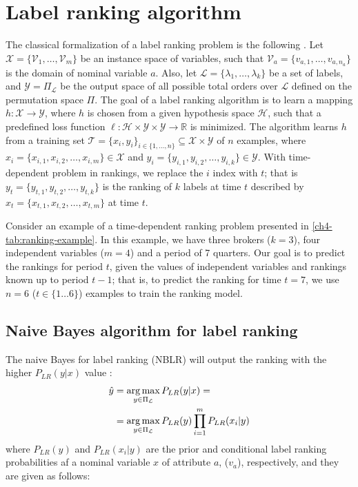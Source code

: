 \section{Label ranking algorithm}
\label{ch4-sec:lr}

The classical formalization of a label ranking problem is the following \citep{vembu2009}. Let $\mathcal{X} = \{\mathcal{V}_1,\ldots,\mathcal{V}_m\}$ be an instance space of  variables, such that $\mathcal{V}_a=\{v_{a,1}, \ldots, v_{a,n_a}\}$ is the domain of nominal variable $a$.  Also, let $\mathcal{L} = \{\lambda_1,\ldots,\lambda_k\}$ be a set of labels, and $\mathcal{Y} = \Pi_{\mathcal{L}}$ be the output space of all possible total orders over $\mathcal{L}$ defined on the permutation space $\Pi$. The goal of a label ranking algorithm is to learn a mapping $h: \mathcal{X} \rightarrow \mathcal{Y}$, where $h$ is chosen from a given hypothesis space $\mathcal{H}$, such that a predefined loss function $\ell: \mathcal{H} \times \mathcal{Y} \times \mathcal{Y} \rightarrow \mathbb{R}$ is minimized. The algorithm learns $h$ from a training set $\mathcal{T}=\{x_i,y_i\}_{i \in \{1, \ldots, n\}} \subseteq \mathcal{X} \times \mathcal{Y}$ of $n$ examples, where $x_i = \{x_{i,1}, x_{i,2}, \ldots, x_{i,m} \} \in \mathcal{X}$ and $ y_i = \{y_{i,1}, y_{i,2}, \dots, y_{i,k}\} \in \mathcal{Y} $. With time-dependent problem in rankings, we replace the $i$ index with $t$; that is $y_t=\{ y_{t,1}, y_{t,2}, \ldots, y_{t,k} \}$ is the ranking of $k$ labels at time $t$ described by $x_t = \{x_{t,1}, x_{t,2}, \ldots, x_{t,m} \} $ at time $t$.


Consider an example of a time-dependent ranking problem presented in \ref{ch4-tab:ranking-example}. In this example, we have three brokers ($k=3$), four independent variables ($m=4$) and a period of 7 quarters. Our goal is to predict the rankings for period $t$, given the values of independent variables and rankings known up to period $t-1$; that is, to predict the ranking for time $t=7$, we use $n=6$ ($t \in \{1 \ldots 6\}$) examples to train the ranking model.




\subsection{Naive Bayes algorithm for label ranking}
\label{ch4-nbr}
The naive Bayes for label ranking (NBLR)  will output the ranking with the higher $P_{LR}(y|x)$ value \citep{aiguzhinov2010}:
\begin{align}
\label{ch4-eq:nb}
\hat{y}&=\operatorname*{arg\,max}_{y \in \Pi_{\mathcal{L}} }P_{LR}(y|x)= \\ \notag
&=\operatorname*{arg\,max}_{y\in \Pi_{\mathcal{L}} }P_{LR}(y)\prod_{i=1}^m P_{LR}(x_i|y)
\end{align}
where $P_{LR}(y)$ and $P_{LR}(x_i|y)$ are the prior and conditional label ranking probabilities af a nominal variable $x$ of attribute $a$, ($v_{a}$), respectively, and they are given as follows:

